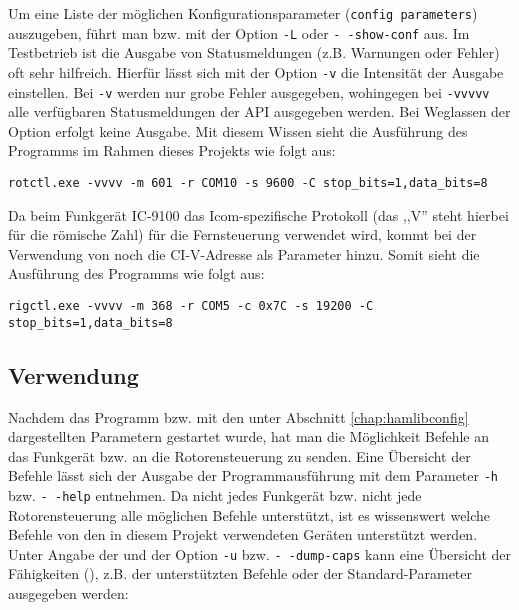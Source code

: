 Um eine Liste der möglichen Konfigurationsparameter (\texttt{config parameters}) auszugeben, führt man  bzw.  mit der Option \texttt{-L} oder \texttt{-\,-show-conf} aus.\newpar
Im Testbetrieb ist die Ausgabe von Statusmeldungen (z.B. Warnungen oder Fehler) oft sehr hilfreich. Hierfür lässt sich mit der Option \texttt{-v} die Intensität der Ausgabe einstellen. Bei \texttt{-v} werden nur grobe Fehler ausgegeben, wohingegen bei \texttt{-vvvvv} alle verfügbaren Statusmeldungen der \ac{API} ausgegeben werden. Bei Weglassen der Option erfolgt keine Ausgabe. Mit diesem Wissen sieht die Ausführung des Programms  im Rahmen dieses Projekts wie folgt aus:

\vspace{-1em}
\begin{shaded}
	\texttt{rotctl.exe -vvvv -m 601 -r COM10 -s 9600 -C stop\_bits=1,data\_bits=8}
\end{shaded}
\vspace{-1em}

Da beim Funkgerät IC-9100 das Icom-spezifische Protokoll  (das ,,V'' steht hierbei für die römische Zahl) für die Fernsteuerung verwendet wird, kommt bei der Verwendung von  noch die CI-V-Adresse als Parameter hinzu. Somit sieht die Ausführung des Programms  wie folgt aus: 

\vspace{-1em}
\begin{shaded}
	\small{\texttt{rigctl.exe -vvvv -m 368 -r COM5 -c 0x7C -s 19200 -C stop\_bits=1,data\_bits=8}}
\end{shaded}

\subsection{Verwendung}
\label{chap:hamlibusage}

Nachdem das Programm  bzw.  mit den unter Abschnitt \ref{chap:hamlibconfig} dargestellten Parametern gestartet wurde, hat man die Möglichkeit Befehle an das Funkgerät bzw. an die Rotorensteuerung zu senden. Eine Übersicht der Befehle lässt sich der Ausgabe der Programmausführung mit dem Parameter \texttt{-h} bzw. \texttt{-\,-help} entnehmen.\newpar
Da nicht jedes Funkgerät bzw. nicht jede Rotorensteuerung alle möglichen Befehle unterstützt, ist es wissenswert welche Befehle von den in diesem Projekt verwendeten Geräten unterstützt werden. Unter Angabe der  und der Option \texttt{-u} bzw. \texttt{-\,-dump-caps} kann eine Übersicht der Fähigkeiten (), z.B. der unterstützten Befehle oder der Standard-Parameter ausgegeben werden:

